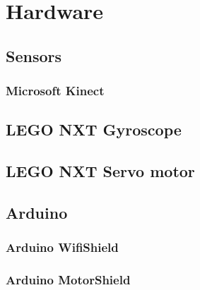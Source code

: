 \chapter{Hardware}
\label{chap:Hardware}

\section{Sensors}
\label{sec:Sensors}

\subsection{Microsoft Kinect}
\label{sec:Microsoft Kinect}

\section{LEGO NXT Gyroscope}
\label{sec:LEGO NXT Gyroscope}

\section{LEGO NXT Servo motor}
\label{sec:LEGO NXT Servo motor}

\section{Arduino}
\label{sec:Arduino}

\subsection{Arduino WifiShield}
\label{sec: Arduino WifiShield}

\subsection{Arduino MotorShield}
\label{sec:Arduino MotorShield}